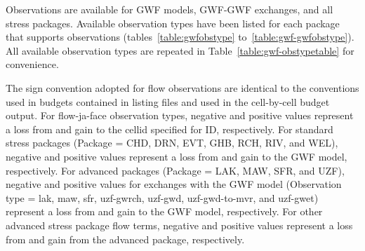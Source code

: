 Observations are available for GWF models, GWF-GWF exchanges, and all stress packages. Available observation types have been listed for each package that supports observations (tables~\ref{table:gwfobstype} to~\ref{table:gwf-gwfobstype}). All available observation types are repeated in Table~\ref{table:gwf-obstypetable} for convenience. 

The sign convention adopted for flow observations are identical to the conventions used in budgets contained in listing files and used in the cell-by-cell budget output. For flow-ja-face observation types, negative and positive values represent a loss from and gain to the cellid specified for ID, respectively. For standard stress packages (Package = CHD, DRN, EVT, GHB, RCH, RIV, and WEL), negative and positive values represent a loss from and gain to the GWF model, respectively. For advanced packages (Package = LAK, MAW, SFR, and UZF), negative and positive values for exchanges with the GWF model (Observation type = lak, maw, sfr, uzf-gwrch, uzf-gwd, uzf-gwd-to-mvr, and uzf-gwet) represent a loss from and gain to the GWF model, respectively. For other advanced stress package flow terms, negative and positive values represent a loss from and gain from the advanced package, respectively.

\FloatBarrier

\FloatBarrier
